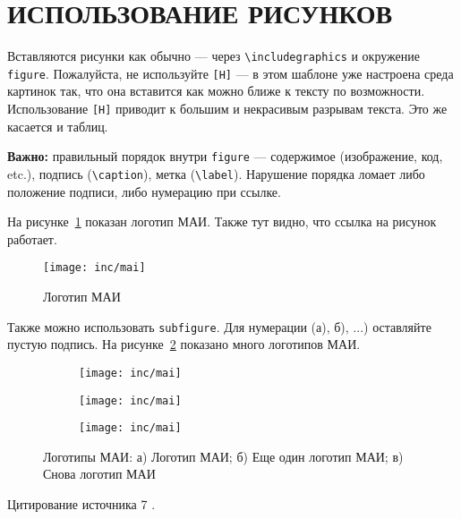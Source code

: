 \section{ИСПОЛЬЗОВАНИЕ РИСУНКОВ}

Вставляются рисунки как обычно --- через 
\texttt{\textbackslash includegraphics} и окружение 
\texttt{figure}. 
Пожалуйста, не используйте \texttt{[H]} --- 
в этом шаблоне уже настроена среда картинок так, 
что она вставится как можно ближе к тексту по возможности. 
Использование \texttt{[H]} приводит к большим и некрасивым 
разрывам текста. Это же касается и таблиц.

\textbf{Важно:} правильный порядок внутри \texttt{figure} --- содержимое (изображение, код, etc.), подпись (\texttt{\textbackslash caption}), метка (\texttt{\textbackslash label}). Нарушение порядка ломает либо положение подписи, либо нумерацию при ссылке.

На рисунке~\ref{fig:fig01} показан логотип МАИ. 
Также тут видно, что ссылка на рисунок работает.

\begin{figure}
  \texttt{[image: inc/mai]}
  \caption{Логотип МАИ}
  \label{fig:fig01}
\end{figure}

Также можно использовать \texttt{subfigure}. Для нумерации (а), б), ...) оставляйте пустую подпись. На рисунке~\ref{fig:fig02} показано много логотипов МАИ.

\begin{figure}
  \begin{subfigure}[t]{0.3\linewidth}
    \centering
    \texttt{[image: inc/mai]}
    \caption{}
  \end{subfigure}
  \hfill
  \begin{subfigure}[t]{0.3\linewidth}
    \centering
    \texttt{[image: inc/mai]}
    \caption{}
  \end{subfigure}
  \hfill
  \begin{subfigure}[t]{0.3\linewidth}
    \centering
    \texttt{[image: inc/mai]}
    \caption{}
  \end{subfigure}
  \caption{Логотипы МАИ: а) Логотип МАИ; б) Еще один логотип МАИ; в) Снова логотип МАИ}
  \label{fig:fig02}
\end{figure}

Цитирование источника 7 \cite{Wikipedia7}.
